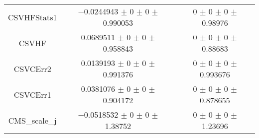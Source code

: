 \begin{table}
\begin{tabular}{ccc}
CSVHFStats1 	& \num{-0.0244943} $\pm$ \num{0} $\pm$ \num{0} $\pm$ \num{0.990053} 	& \num{0} $\pm$ \num{0} $\pm$ \num{0} $\pm$ \num{0.98976}\\
CSVHF 	& \num{0.0689511} $\pm$ \num{0} $\pm$ \num{0} $\pm$ \num{0.958843} 	& \num{0} $\pm$ \num{0} $\pm$ \num{0} $\pm$ \num{0.88683}\\
CSVCErr2 	& \num{0.0139193} $\pm$ \num{0} $\pm$ \num{0} $\pm$ \num{0.991376} 	& \num{0} $\pm$ \num{0} $\pm$ \num{0} $\pm$ \num{0.993676}\\
CSVCErr1 	& \num{0.0381076} $\pm$ \num{0} $\pm$ \num{0} $\pm$ \num{0.904172} 	& \num{0} $\pm$ \num{0} $\pm$ \num{0} $\pm$ \num{0.878655}\\
CMS\_scale\_j 	& \num{-0.0518532} $\pm$ \num{0} $\pm$ \num{0} $\pm$ \num{1.38752} 	& \num{0} $\pm$ \num{0} $\pm$ \num{0} $\pm$ \num{1.23696}\\
\bottomrule
\end{tabular}
\end{table}